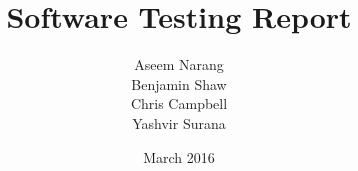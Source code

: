\documentclass{article}
\begin{document}
\title{Software Testing Report}
\author{Aseem Narang\\Benjamin Shaw\\Chris Campbell\\Yashvir Surana}
\date{March 2016}

\maketitle
\end{document}
